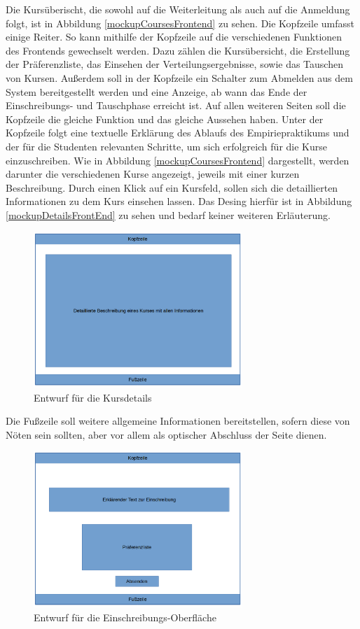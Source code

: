 Die Kursüberischt, die sowohl auf die Weiterleitung als auch auf die Anmeldung folgt, ist in Abbildung \ref{mockupCoursesFrontend} zu sehen.
Die Kopfzeile umfasst einige Reiter.
So kann mithilfe der Kopfzeile auf die verschiedenen Funktionen des Frontends gewechselt werden. 
Dazu zählen die Kursübersicht, die Erstellung der Präferenzliste, das Einsehen der Verteilungsergebnisse, sowie das Tauschen von Kursen.
Außerdem soll in der Kopfzeile ein Schalter zum Abmelden aus dem System bereitgestellt werden und eine Anzeige, ab wann das Ende der Einschreibungs- und Tauschphase erreicht ist.
Auf allen weiteren Seiten soll die Kopfzeile die gleiche Funktion und das gleiche Aussehen haben.
Unter der Kopfzeile folgt eine textuelle Erklärung des Ablaufs des Empiriepraktikums und der für die Studenten relevanten Schritte, um sich erfolgreich für die Kurse einzuschreiben.
Wie in Abbildung \ref{mockupCoursesFrontend} dargestellt, werden darunter die verschiedenen Kurse angezeigt, jeweils mit einer kurzen Beschreibung.
Durch einen Klick auf ein Kursfeld, sollen sich die detaillierten Informationen zu dem Kurs einsehen lassen.
Das Desing hierfür ist in Abbildung \ref{mockupDetailsFrontEnd} zu sehen und bedarf keiner weiteren Erläuterung.
\begin{figure}[t]
	\centering
	\includegraphics[width=0.7\textwidth]{./design/MockUpsFrontend/kursdetails.png}
	\caption{Entwurf für die Kursdetails}
	\label{mockupDetailsFrontend}
\end{figure}
Die Fußzeile soll weitere allgemeine Informationen bereitstellen, sofern diese von Nöten sein sollten, aber vor allem als optischer Abschluss der Seite dienen.
\begin{figure}[t]
	\centering
	\includegraphics[width=0.7\textwidth]{./design/MockUpsFrontend/einschreibung.png}
	\caption{Entwurf für die Einschreibungs-Oberfläche}
	\label{mockupCourseChoiceFrontend}
\end{figure}

